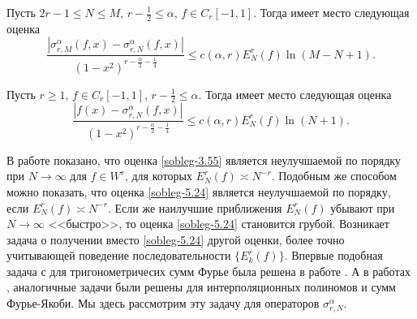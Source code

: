 \begin{lemma} Пусть $2r-1\le N\le M$, $r-\frac12\le\alpha$, $f\in C_r[-1,1]$. Тогда имеет место следующая оценка
\begin{equation}\label{sobleg-5.22}
\frac{|\sigma_{r,M}^\alpha(f,x)-\sigma_{r,N}^\alpha(f,x)|}
{(1-x^2)^{r-\frac{\alpha}{2}-\frac14}}\le
c(\alpha,r)E_N^r(f)\ln(M-N+1).
 \end{equation}
\end{lemma}


\begin{lemma} Пусть $r\ge1$, $f\in C_r[-1,1]$, $r-\frac12\le\alpha$. Тогда имеет место следующая оценка
\begin{equation}\label{sobleg-5.24}
\frac{|f(x)-\sigma_{r,N}^\alpha(f,x)|}
{(1-x^2)^{r-\frac{\alpha}{2}-\frac14}}\le
c(\alpha,r)E_N^r(f)\ln(N+1).
 \end{equation}
\end{lemma}

В работе \cite{Shar15} показано, что оценка \eqref{sobleg-3.55}  является неулучшаемой по порядку при $N\to\infty$ для  $f\in W^r$, для которых $E^{r}_{N}(f)\asymp N^{-r}$. Подобным же способом можно показать, что оценка  \eqref{sobleg-5.24} является неулучшаемой по порядку, если $E^{r}_{N}(f)\asymp N^{-r}$.   Если же  наилучшие приближения  $E^{r}_{N}(f)$ убывают при $N\to\infty$ <<быстро>>, то оценка \eqref{sobleg-5.24}   становится грубой. Возникает задача о получении вместо \eqref{sobleg-5.24} другой оценки, более точно учитывающей поведение последовательности  $\{E^{r}_{k}(f)\}$. Впервые подобная задача с для тригонометричесих сумм Фурье была решена в работе \cite{OSK}. А в работах \cite{sharap1}, \cite{sharap2} аналогичные задачи были решены для интерполяционных полиномов и сумм Фурье-Якоби. Мы здесь рассмотрим  эту задачу  для операторов $\sigma_{r,N}^\alpha$.


